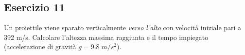 \documentclass[12pt,a4paper]{book}
\begin{document}
% 

\subsection*{Esercizio 11}
Un proiettile viene sparato verticalmente \textit{verso l'alto} con velocità iniziale pari a 392 m/s. Calcolare l'altezza massima raggiunta e il tempo impiegato (accelerazione di gravità $g = 9.8 \; m/s^2$).
\end{document}
